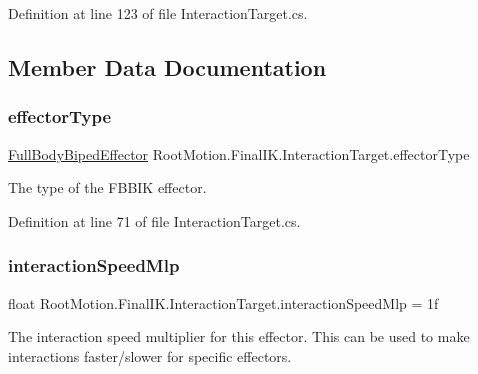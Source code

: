 Definition at line 123 of file Interaction\+Target.\+cs.



\subsection{Member Data Documentation}
\mbox{\label{class_root_motion_1_1_final_i_k_1_1_interaction_target_aee5d6153ee0db382892b8af4d3eaef49}} 
\subsubsection{\texorpdfstring{effector\+Type}{effectorType}}
{\footnotesize\ttfamily \mbox{\hyperlink{namespace_root_motion_1_1_final_i_k_ae0dd2058c7667b6f132c11a6b860c14a}{Full\+Body\+Biped\+Effector}} Root\+Motion.\+Final\+I\+K.\+Interaction\+Target.\+effector\+Type}



The type of the F\+B\+B\+IK effector. 



Definition at line 71 of file Interaction\+Target.\+cs.

\mbox{\label{class_root_motion_1_1_final_i_k_1_1_interaction_target_a07a0f69b80289668ebc348e10164be6d}} 
\subsubsection{\texorpdfstring{interaction\+Speed\+Mlp}{interactionSpeedMlp}}
{\footnotesize\ttfamily float Root\+Motion.\+Final\+I\+K.\+Interaction\+Target.\+interaction\+Speed\+Mlp = 1f}



The interaction speed multiplier for this effector. This can be used to make interactions faster/slower for specific effectors. 



